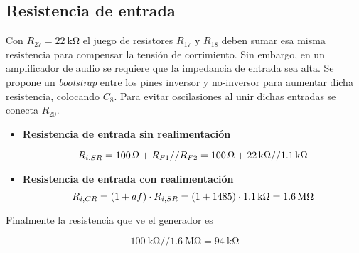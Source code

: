 \subsection{Resistencia de entrada}
	
	Con $R_{27}=\SI{22}{\kilo\ohm}$ el juego de resistores $R_{17}$ y $R_{18}$ deben sumar esa misma resistencia para compensar la tensión de corrimiento. Sin embargo, en un amplificador de audio se requiere que la impedancia de entrada sea alta. Se propone un \emph{bootstrap} entre los pines inversor y no-inversor para aumentar dicha resistencia, colocando $C_8$. Para evitar oscilasiones al unir dichas entradas se conecta $R_{20}$.
	

\begin{itemize}
	
		
\item \textbf{Resistencia de entrada sin realimentación}
	
	\begin{equation}
		\centering
		R_{i,SR} = \SI{100}{\ohm} + R_{F1}//R_{F2} = \SI{100}{\ohm} + \SI{22}{\kilo\ohm}//\SI{1.1}{\kilo\ohm}
	\end{equation}
	
\item \textbf{Resistencia de entrada con realimentación}
	\begin{equation}
		\centering
		R_{i,CR} = (1+ af) \cdot R_{i,SR} = (1 + 1485) \cdot \SI{1.1}{\kilo\ohm} = \SI{1.6}{\mega\ohm}
	\end{equation}
	
\end{itemize}

Finalmente la resistencia que ve el generador es

$$ \SI{100}{\kilo\ohm}//\SI{1.6}{\mega\ohm} = \boxed{\SI{94}{\kilo\ohm}} $$



